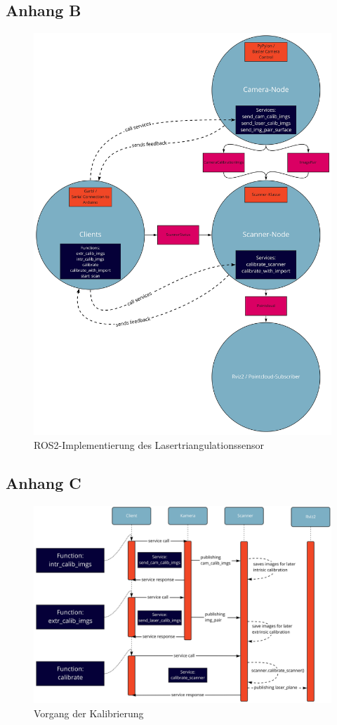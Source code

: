 \documentclass[	12pt,
				a4paper,
				bibliography=totoc,
				listof=totoc,
				index=totoc,
				twoside,
				headsepline,
				footsepline,
				ngerman]{scrartcl}
\begin{document}
\begin{appendix}
		\subsection{Anhang B}\label{anhang-b}
		\begin{figure}[h!]
			\centering
			\includegraphics[width=0.9\linewidth]{img/anhang/ROS2_implementation.jpg}
			\caption{ROS2-Implementierung des Lasertriangulationssensor}
			\label{fig:ros2_all}
		\end{figure}
		\newpage
		\subsection{Anhang C}\label{anhang-c}
			\begin{figure}[h!]
				\centering
				\includegraphics[width=1\linewidth]{img/anhang/vorgang_kalibrierung.jpg}
				\caption{Vorgang der Kalibrierung}
				\label{fig:vorgang_kalibrierung}
			\end{figure}
		\newpage

\end{appendix}
\end{document}
